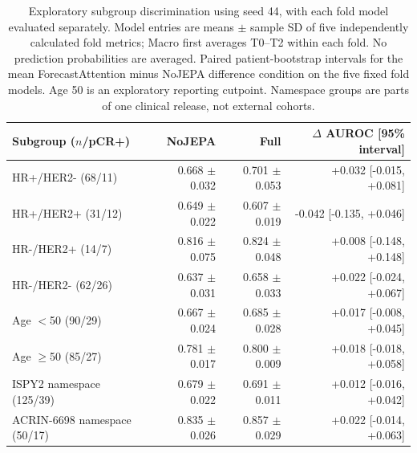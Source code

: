 \begin{table}[t]
\centering
\small
\caption{Exploratory subgroup discrimination using seed 44, with each fold model evaluated separately. Model entries are means $\pm$ sample SD of five independently calculated fold metrics; Macro first averages T0--T2 within each fold. No prediction probabilities are averaged. Paired patient-bootstrap intervals for the mean ForecastAttention minus NoJEPA difference condition on the five fixed fold models. Age 50 is an exploratory reporting cutpoint. Namespace groups are parts of one clinical release, not external cohorts.}
\label{tab:subgroups}
\begin{tabular}{lrrr}
\toprule
Subgroup ($n$/pCR+) & NoJEPA & Full & $\Delta$ AUROC [95\% interval] \\
\midrule
HR+/HER2- (68/11) & 0.668 $\pm$ 0.032 & 0.701 $\pm$ 0.053 & +0.032 [-0.015, +0.081] \\
HR+/HER2+ (31/12) & 0.649 $\pm$ 0.022 & 0.607 $\pm$ 0.019 & -0.042 [-0.135, +0.046] \\
HR-/HER2+ (14/7) & 0.816 $\pm$ 0.075 & 0.824 $\pm$ 0.048 & +0.008 [-0.148, +0.148] \\
HR-/HER2- (62/26) & 0.637 $\pm$ 0.031 & 0.658 $\pm$ 0.033 & +0.022 [-0.024, +0.067] \\
Age $<$50 (90/29) & 0.667 $\pm$ 0.024 & 0.685 $\pm$ 0.028 & +0.017 [-0.008, +0.045] \\
Age $\geq$50 (85/27) & 0.781 $\pm$ 0.017 & 0.800 $\pm$ 0.009 & +0.018 [-0.018, +0.058] \\
ISPY2 namespace (125/39) & 0.679 $\pm$ 0.022 & 0.691 $\pm$ 0.011 & +0.012 [-0.016, +0.042] \\
ACRIN-6698 namespace (50/17) & 0.835 $\pm$ 0.026 & 0.857 $\pm$ 0.029 & +0.022 [-0.014, +0.063] \\
\bottomrule
\end{tabular}
\end{table}
